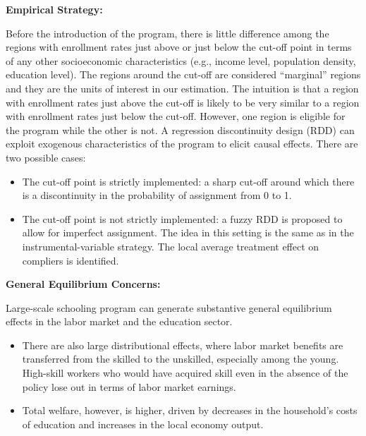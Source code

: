 \documentclass[a4paper, 11pt]{article}
\begin{document}
\textbf{Empirical Strategy:}

Before the introduction of the program, there is little difference among the regions with enrollment rates just above or just below the cut-off point in terms of any other socioeconomic characteristics (e.g., income level, population density, education level). The regions around the cut-off are considered ``marginal'' regions and they are the units of interest in our estimation. The intuition is that a region with enrollment rates just above the cut-off is likely to be very similar to a region with enrollment rates just below the cut-off. However, one region is eligible for the program while the other is not. A regression discontinuity design (RDD) can exploit exogenous characteristics of the program to elicit causal effects. There are two possible cases:

\begin{itemize}
    \item The cut-off point is strictly implemented: a sharp cut-off around which there is a discontinuity in the probability of assignment from 0 to 1.
    \item The cut-off point is not strictly implemented: a fuzzy RDD is proposed to allow for imperfect assignment. The idea in this setting is the same as in the instrumental-variable strategy. The local average treatment effect on compliers is identified.
\end{itemize}

\textbf{General Equilibrium Concerns:}

Large-scale schooling program can generate substantive general equilibrium effects in the labor market and the education sector.
\begin{itemize}
    \item There are also large distributional effects, where labor market benefits are transferred from the skilled to the unskilled, especially among the young. High-skill workers who would have acquired skill even in the absence of the policy lose out in terms of labor market earnings.
    \item Total welfare, however, is higher, driven by decreases in the household’s costs of education and increases in the local economy output.
\end{itemize}

 
\end{document}
